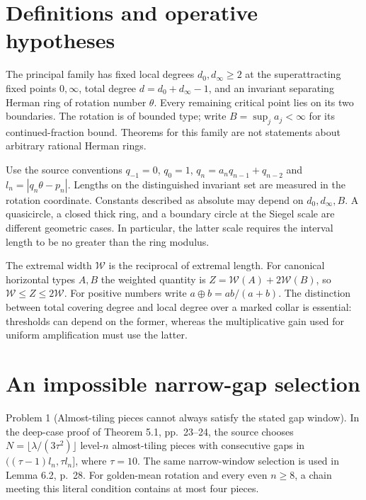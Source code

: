 \documentclass[10pt]{article}
\begin{document}
\section*{Definitions and operative hypotheses}
The principal family has fixed local degrees \(d_0,d_\infty\geq2\) at the superattracting fixed points \(0,\infty\), total degree \(d=d_0+d_\infty-1\), and an invariant separating Herman ring of rotation number \(\theta\). Every remaining critical point lies on its two boundaries. The rotation is of bounded type; write \(B=\sup_j a_j<\infty\) for its continued-fraction bound. Theorems for this family are not statements about arbitrary rational Herman rings.\par
Use the source conventions \(q_{-1}=0\), \(q_0=1\), \(q_n=a_nq_{n-1}+q_{n-2}\) and \(l_n=|q_n\theta-p_n|\). Lengths on the distinguished invariant set are measured in the rotation coordinate. Constants described as absolute may depend on \(d_0,d_\infty,B\). A quasicircle, a closed thick ring, and a boundary circle at the Siegel scale are different geometric cases. In particular, the latter scale requires the interval length to be no greater than the ring modulus.\par
The extremal width \(\mathcal W\) is the reciprocal of extremal length. For canonical horizontal types \(A,B\) the weighted quantity is \(Z=\mathcal W(A)+2\mathcal W(B)\), so \(\mathcal W\leq Z\leq2\mathcal W\). For positive numbers write \(a\oplus b=ab/(a+b)\). The distinction between total covering degree and local degree over a marked collar is essential: thresholds can depend on the former, whereas the multiplicative gain used for uniform amplification must use the latter.\par
\section*{An impossible narrow-gap selection}
Problem 1 (Almost-tiling pieces cannot always satisfy the stated gap window).  In the deep-case proof of Theorem 5.1, pp. 23–24, the source chooses \(N=\lfloor\lambda/(3\tau^2)\rfloor\) level-\(n\) almost-tiling pieces with consecutive gaps in \(((\tau-1)l_n,\tau l_n]\), where \(\tau=10\). The same narrow-window selection is used in Lemma 6.2, p. 28. For golden-mean rotation and every even \(n\geq8\), a chain meeting this literal condition contains at most four pieces.\par
\end{document}
